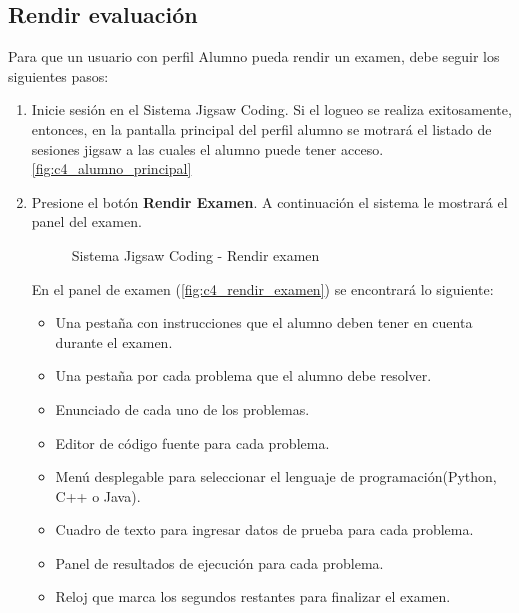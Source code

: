 \subsection{Rendir evaluación}
Para que un usuario con perfil Alumno pueda rendir un examen, debe seguir los siguientes pasos:

\begin{enumerate}
	\item Inicie sesión en el Sistema Jigsaw Coding. Si el logueo se realiza exitosamente, entonces, en la pantalla principal del perfil alumno se motrará el listado de sesiones jigsaw a las cuales el alumno puede tener acceso.\autoref{fig:c4_alumno_principal}
	\item Presione el botón \textbf{Rendir Examen}. A continuación el sistema le mostrará el panel del examen.
	
	\begin{figure}[h!]
		\centering
		\caption{Sistema Jigsaw Coding - Rendir examen}
		\label{fig:c4_rendir_examen}
	\end{figure}
	
	En el panel de examen  (\autoref{fig:c4_rendir_examen}) se encontrará lo siguiente: 
	
	\begin{itemize}
		\item Una pestaña con instrucciones que el alumno deben tener en cuenta durante el examen.
		\item Una pestaña por cada problema que el alumno debe resolver.
		\item Enunciado de cada uno de los problemas.
		\item Editor de código fuente para cada problema.
		\item Menú desplegable para seleccionar el lenguaje de programación(Python, C++ o Java).
		\item Cuadro de texto para ingresar datos de prueba para cada problema.
		\item Panel de resultados de ejecución para cada problema.
		\item Reloj que marca los segundos restantes para finalizar el examen.
	\end{itemize}
	

\end{enumerate}
